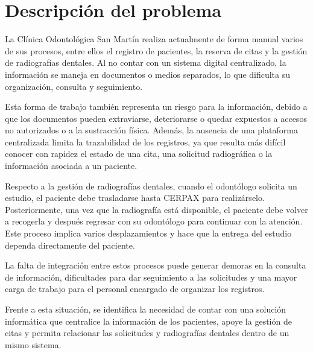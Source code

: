 	\section{Descripción del problema}

La Clínica Odontológica San Martín realiza actualmente de forma manual
varios de sus procesos, entre ellos el registro de pacientes, la reserva
de citas y la gestión de radiografías dentales. Al no contar con un sistema
digital centralizado, la información se maneja en documentos o medios
separados, lo que dificulta su organización, consulta y seguimiento.

Esta forma de trabajo también representa un riesgo para la información,
debido a que los documentos pueden extraviarse, deteriorarse o quedar
expuestos a accesos no autorizados o a la sustracción física. Además, la
ausencia de una plataforma centralizada limita la trazabilidad de los
registros, ya que resulta más difícil conocer con rapidez el estado de una
cita, una solicitud radiográfica o la información asociada a un paciente.

Respecto a la gestión de radiografías dentales, cuando el odontólogo solicita
un estudio, el paciente debe trasladarse hasta CERPAX para realizárselo.
Posteriormente, una vez que la radiografía está disponible, el paciente debe
volver a recogerla y después regresar con su odontólogo para continuar con
la atención. Este proceso implica varios desplazamientos y hace que la
entrega del estudio dependa directamente del paciente.

La falta de integración entre estos procesos puede generar demoras en la
consulta de información, dificultades para dar seguimiento a las solicitudes
y una mayor carga de trabajo para el personal encargado de organizar los
registros.

Frente a esta situación, se identifica la necesidad de contar con una
solución informática que centralice la información de los pacientes,
apoye la gestión de citas y permita relacionar las solicitudes y
radiografías dentales dentro de un mismo sistema.

		
		
			
			
			
